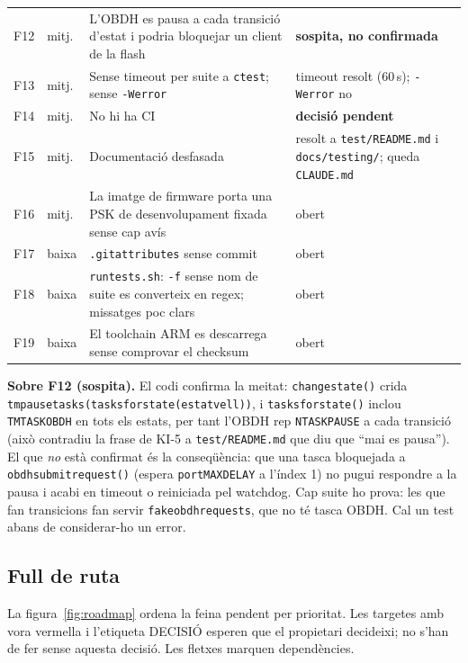 \documentclass[11pt,a4paper]{article}
\DeclareRobustCommand{\_}{\textunderscore\allowbreak}
\newcommand{\cd}[1]{\texttt{#1}}
\begin{document}
\begin{longtable}{@{}l l>{\raggedright\arraybackslash}p{9.6cm}>{\raggedright\arraybackslash}p{4.3cm}@{}}
F12 & mitj. & L'OBDH es pausa a cada transició d'estat i podria bloquejar un client de la flash & \textbf{sospita, no confirmada}\\
F13 & mitj. & Sense timeout per suite a \cd{ctest}; sense \cd{-Werror} & timeout resolt (60\,s); \cd{-Werror} no\\
F14 & mitj. & No hi ha CI & \textbf{decisió pendent}\\
F15 & mitj. & Documentació desfasada & resolt a \cd{test/README.md} i \cd{docs/testing/}; queda \cd{CLAUDE.md}\\
F16 & mitj. & La imatge de firmware porta una PSK de desenvolupament fixada sense cap avís & obert\\
F17 & baixa & \cd{.gitattributes} sense commit & obert\\
F18 & baixa & \cd{run\_tests.sh}: \cd{-f} sense nom de suite es converteix en regex; missatges poc clars & obert\\
F19 & baixa & El toolchain ARM es descarrega sense comprovar el checksum & obert\\
\end{longtable}
\endgroup

\textbf{Sobre F12 (sospita).} El codi confirma la meitat: \cd{change\_state()} crida
\cd{tm\_pause\_tasks(tasks\_for\_state(estat\_vell))}, i \cd{tasks\_for\_state()} inclou
\cd{TM\_TASK\_OBDH} en tots els estats, per tant l'OBDH rep \cd{N\_TASK\_PAUSE} a cada transició
(això contradiu la frase de KI-5 a \cd{test/README.md} que diu que ``mai es pausa''). El que
\emph{no} està confirmat és la conseqüència: que una tasca bloquejada a \cd{obdh\_submit\_request()}
(espera \cd{portMAX\_DELAY} a l'índex 1) no pugui respondre a la pausa i acabi en timeout o
reiniciada pel watchdog. Cap suite ho prova: les que fan transicions fan servir
\cd{fake\_obdh\_requests}, que no té tasca OBDH. Cal un test abans de considerar-ho un error.

\subsection{Full de ruta}

La figura~\ref{fig:roadmap} ordena la feina pendent per prioritat. Les targetes amb vora vermella
i l'etiqueta DECISIÓ esperen que el propietari decideixi; no s'han de fer sense aquesta
decisió. Les fletxes marquen dependències.
\end{document}
